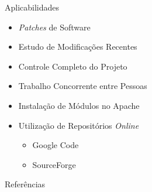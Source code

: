 \documentclass[hyperref={pdfpagelabels=false}]{beamer}
\begin{document}
\begin{frame}{Aplicabilidades}
    \begin{itemize}
        \item \textit{Patches} de Software
        \item Estudo de Modificações Recentes
        \item Controle Completo do Projeto
        \item Trabalho Concorrente entre Pessoas
        \item Instalação de Módulos no Apache
        \item Utilização de Repositórios \textit{Online}
        \begin{itemize}
            \item Google Code
            \item SourceForge
        \end{itemize}
    \end{itemize}
\end{frame}


\begin{frame}{Referências}
    
    
\end{frame}

\begin{frame}
    \maketitle{}
\end{frame}
\end{document}
